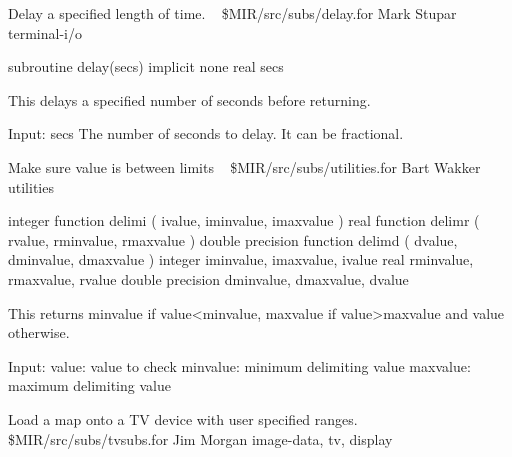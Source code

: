 %
\noindent Delay a specified length of time.
\newline \ 
\newline {} \$MIR/src/subs/delay.for
\newline {} Mark Stupar
\newline {} terminal-i/o
\par{\tenpoint
{\eightpoint\begintt
        subroutine delay(secs)
        implicit none
        real secs

  This delays a specified number of seconds before returning.

  Input:
    secs       The number of seconds to delay. It can be fractional.
\endtt}
\par}
%
\noindent Make sure value is between limits
\newline \ 
\newline {} \$MIR/src/subs/utilities.for
\newline {} Bart Wakker
\newline \abox{Keywords:} utilities
\par{\tenpoint
{\eightpoint\begintt
      integer          function delimi ( ivalue, iminvalue, imaxvalue )
      real             function delimr ( rvalue, rminvalue, rmaxvalue )
      double precision function delimd ( dvalue, dminvalue, dmaxvalue )
      integer          iminvalue, imaxvalue, ivalue
      real             rminvalue, rmaxvalue, rvalue
      double precision dminvalue, dmaxvalue, dvalue

 This returns minvalue if value<minvalue, maxvalue if value>maxvalue and value
 otherwise.

 Input:
   value:     value to check
   minvalue:  minimum delimiting value
   maxvalue:  maximum delimiting value
\endtt}
\par}
%
\noindent Load a map onto a TV device with user specified ranges.
\newline \ 
\newline {} \$MIR/src/subs/tvsubs.for
\newline \abox{Responsible:} Jim Morgan
\newline {} image-data, tv, display
